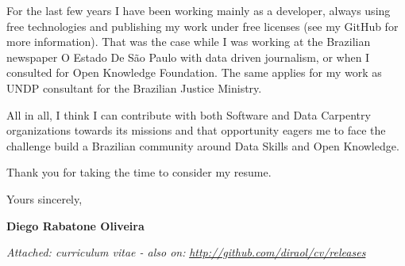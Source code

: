 \documentclass[11pt]{friggeri-cover-letter}
\begin{document}
\vfill

For the last few years I have been working mainly as a developer, always using
free technologies and publishing my work under free licenses (see my GitHub for
more information). That was the case while I was working at the Brazilian
newspaper O Estado De São Paulo with data driven journalism, or when I
consulted for Open Knowledge Foundation. The same applies for my work as UNDP
consultant for the Brazilian Justice Ministry.

\vfill

All in all, I think I can contribute with both Software and Data Carpentry
organizations towards its missions and that opportunity eagers me to face the
challenge build a Brazilian community around Data Skills and Open Knowledge.

\vfill

Thank you for taking the time to consider my resume.

\vfill

\hfill Yours sincerely,

\hfill \textbf{Diego Rabatone Oliveira}

\vfill

\footnotesize{\thinfont\color{lightgray}\textit{Attached: curriculum vitae - also on:} \textit{\url{http://github.com/diraol/cv/releases}}}
\end{document}
